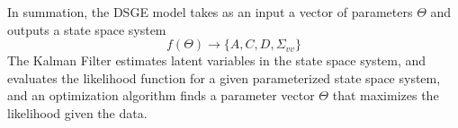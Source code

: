 \documentclass[10pt]{article}
\begin{document}
\begin{remark}
	In summation, the DSGE model takes as an input a vector of parameters $\Theta$ and outputs a state space system \[f(\Theta) \to \{A,C,D,\Sigma_{vv}\}\]The Kalman Filter estimates latent variables in the state space system, and evaluates the likelihood function for a given parameterized state space system, and an optimization algorithm finds a parameter vector $\Theta$ that maximizes the likelihood given the data.
\end{remark}
\end{document}
